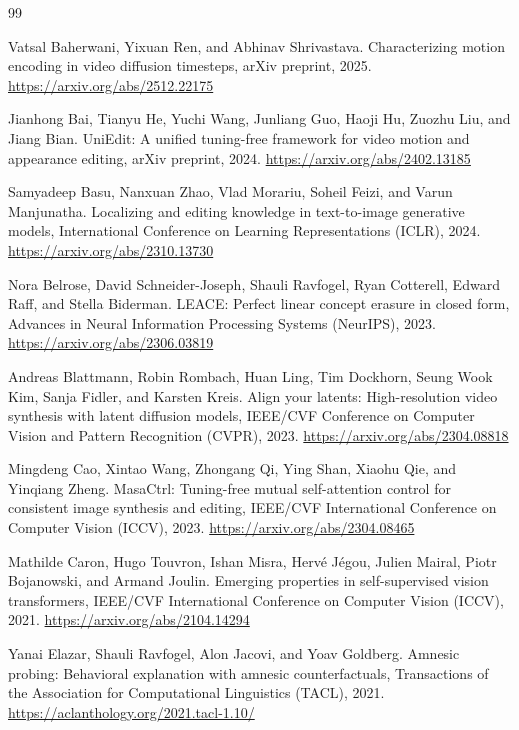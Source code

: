 \documentclass[twoside,english]{article}
\begin{document}
\begin{thebibliography}{99}
\setlength{\itemsep}{1pt}
\small

 Vatsal Baherwani, Yixuan Ren, and Abhinav Shrivastava. Characterizing motion encoding in video diffusion timesteps, arXiv preprint, 2025. \url{https://arxiv.org/abs/2512.22175}

 Jianhong Bai, Tianyu He, Yuchi Wang, Junliang Guo, Haoji Hu, Zuozhu Liu, and Jiang Bian. UniEdit: A unified tuning-free framework for video motion and appearance editing, arXiv preprint, 2024. \url{https://arxiv.org/abs/2402.13185}

 Samyadeep Basu, Nanxuan Zhao, Vlad Morariu, Soheil Feizi, and Varun Manjunatha. Localizing and editing knowledge in text-to-image generative models, International Conference on Learning Representations (ICLR), 2024. \url{https://arxiv.org/abs/2310.13730}

 Nora Belrose, David Schneider-Joseph, Shauli Ravfogel, Ryan Cotterell, Edward Raff, and Stella Biderman. LEACE: Perfect linear concept erasure in closed form, Advances in Neural Information Processing Systems (NeurIPS), 2023. \url{https://arxiv.org/abs/2306.03819}

 Andreas Blattmann, Robin Rombach, Huan Ling, Tim Dockhorn, Seung Wook Kim, Sanja Fidler, and Karsten Kreis. Align your latents: High-resolution video synthesis with latent diffusion models, IEEE/CVF Conference on Computer Vision and Pattern Recognition (CVPR), 2023. \url{https://arxiv.org/abs/2304.08818}

 Mingdeng Cao, Xintao Wang, Zhongang Qi, Ying Shan, Xiaohu Qie, and Yinqiang Zheng. MasaCtrl: Tuning-free mutual self-attention control for consistent image synthesis and editing, IEEE/CVF International Conference on Computer Vision (ICCV), 2023. \url{https://arxiv.org/abs/2304.08465}

 Mathilde Caron, Hugo Touvron, Ishan Misra, Herv\'e J\'egou, Julien Mairal, Piotr Bojanowski, and Armand Joulin. Emerging properties in self-supervised vision transformers, IEEE/CVF International Conference on Computer Vision (ICCV), 2021. \url{https://arxiv.org/abs/2104.14294}

 Yanai Elazar, Shauli Ravfogel, Alon Jacovi, and Yoav Goldberg. Amnesic probing: Behavioral explanation with amnesic counterfactuals, Transactions of the Association for Computational Linguistics (TACL), 2021. \url{https://aclanthology.org/2021.tacl-1.10/}


\end{thebibliography}
\end{document}
